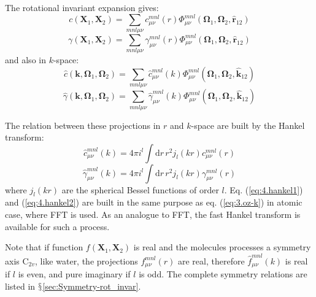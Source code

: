 The rotational invariant expansion gives:
\begin{equation}
c(\mathbf{X}_{1},\mathbf{X}_{2})=\sum_{mnl\mu\nu}c_{\mu\nu}^{mnl}(r)\Phi_{\mu\nu}^{mnl}(\mathbf{\Omega}_{1},\mathbf{\Omega}_{2},\mathbf{\hat{r}}_{12})
\end{equation}
\begin{equation}
\gamma(\mathbf{X}_{1},\mathbf{X}_{2})=\sum_{mnl\mu\nu}\gamma_{\mu\nu}^{mnl}(r)\Phi_{\mu\nu}^{mnl}(\mathbf{\Omega}_{1},\mathbf{\Omega}_{2},\mathbf{\hat{r}}_{12})
\end{equation}
and also in $k$-space:
\begin{equation}
\hat{c}(\mathbf{k},\mathbf{\Omega}_{1},\mathbf{\Omega}_{2})=\sum_{mnl\mu\nu}\hat{c}_{\mu\nu}^{mnl}(k)\Phi_{\mu\nu}^{mnl}(\mathbf{\Omega}_{1},\mathbf{\Omega}_{2},\mathbf{\hat{k}}_{12})
\end{equation}
\begin{equation}
\hat{\gamma}(\mathbf{k},\mathbf{\Omega}_{1},\mathbf{\Omega}_{2})=\sum_{mnl\mu\nu}\hat{\gamma}_{\mu\nu}^{mnl}(k)\Phi_{\mu\nu}^{mnl}(\mathbf{\Omega}_{1},\mathbf{\Omega}_{2},\mathbf{\hat{k}}_{12})
\end{equation}

The relation between these projections in $r$ and $k$-space are
built by the Hankel transform:
\begin{equation}
\hat{c}_{\mu\nu}^{mnl}(k)=4\pi i^{l}\int\mathrm{d}r\,r^{2}j_{l}(kr)c_{\mu\nu}^{mnl}(r)\label{eq:4.hankel1}
\end{equation}
\begin{equation}
\hat{\gamma}_{\mu\nu}^{mnl}(k)=4\pi i^{l}\int\mathrm{d}r\,r^{2}j_{l}(kr)\gamma_{\mu\nu}^{mnl}(r)\label{eq:4.hankel2}
\end{equation}
where $j_{l}(kr)$ are the spherical Bessel functions of order $l$.
Eq. (\ref{eq:4.hankel1}) and (\ref{eq:4.hankel2}) are built in the
same purpose as eq. (\ref{eq:3.oz-k}) in atomic case, where \acs{FFT}
is used. As an analogue to \acs{FFT}, the fast Hankel transform is
available for such a process. 

Note that if function $f(\mathbf{X}_{1},\mathbf{X}_{2})$ is real
and the molecules processes a symmetry axis $\mathrm{C}_{2v}$, like
water, the projections $f_{\mu\nu}^{mnl}(r)$ are real, therefore
$\hat{f}_{\mu\nu}^{mnl}(k)$ is real if $l$ is even, and pure imaginary
if $l$ is odd. The complete symmetry relations are listed in $\mathsection$\ref{sec:Symmetry-rot_invar}.

